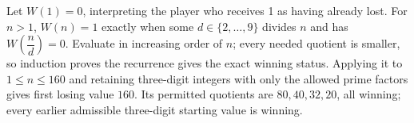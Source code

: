 Let $W(1)=0$, interpreting the player who receives 1 as having already lost. For $n>1$, $W(n)=1$ exactly when some $d\in\{2,\ldots,9\}$ divides $n$ and has $W (\dfrac{n}{d}) = 0$. Evaluate in increasing order of $n$; every needed quotient is smaller, so induction proves the recurrence gives the exact winning status. Applying it to $1\le n\le160$ and retaining three-digit integers with only the allowed prime factors gives first losing value $\boxed{160}$. Its permitted quotients are $80,40,32,20$, all winning; every earlier admissible three-digit starting value is winning.
